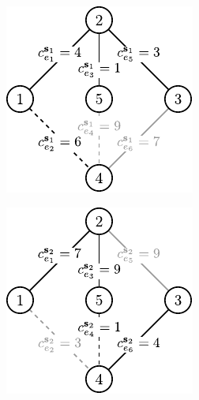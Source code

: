 \begin{figure}[!htbp]
\begin{subfigure}[b]{0.3\textwidth}
		\includegraphics[width=\textwidth]{Chapter_II/ROB-INC-MST-example/b2}
		\caption{}
		\label{fig:robincrexample:e}
	\end{subfigure}
	\hfill
	\begin{subfigure}[b]{0.3\textwidth}
		\includegraphics[width=\textwidth]{Chapter_II/ROB-INC-MST-example/c2}

\end{subfigure}
\end{figure}
